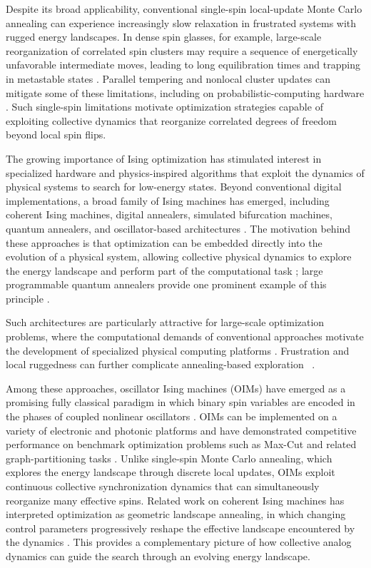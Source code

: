 \documentclass[
reprint,
amsmath,amssymb,
aps,
pre,
floatfix,
]{revtex4-2}
\begin{document}
Despite its broad applicability, conventional single-spin local-update Monte Carlo annealing can experience increasingly slow relaxation in frustrated systems with rugged energy landscapes. In dense spin glasses, for example, large-scale reorganization of correlated spin clusters may require a sequence of energetically unfavorable intermediate moves, leading to long equilibration times and trapping in metastable states \cite{BinderYoung1986,Young1997,MPV1987}. Parallel tempering and nonlocal cluster updates can mitigate some of these limitations, including on probabilistic-computing hardware \cite{Chowdhury2025ProbabilisticComputers}. Such single-spin limitations motivate optimization strategies capable of exploiting collective dynamics that reorganize correlated degrees of freedom beyond local spin flips.

The growing importance of Ising optimization has stimulated interest in specialized hardware and physics-inspired algorithms that exploit the dynamics of physical systems to search for low-energy states. Beyond conventional digital implementations, a broad family of Ising machines has emerged, including coherent Ising machines, digital annealers, simulated bifurcation machines, quantum annealers, and oscillator-based architectures \cite{machines,Delacour2026ProbabilisticReview,machines1,machines2,Goto2021}. The motivation behind these approaches is that optimization can be embedded
directly into the evolution of a physical system, allowing collective physical
dynamics to explore the energy landscape and perform part of the computational
task \cite{OIM}; large programmable quantum annealers provide one prominent
example of this principle \cite{King2023QuantumCritical}.

Such architectures are particularly attractive for large-scale optimization
problems, where the computational demands of conventional approaches motivate
the development of specialized physical computing platforms
\cite{machines,Neumann}. Frustration and local ruggedness can further complicate annealing-based exploration ~\cite{King2019Ruggedness}.

Among these approaches, oscillator Ising machines (OIMs) have emerged as a
promising fully classical paradigm in which binary spin variables are encoded
in the phases of coupled nonlinear oscillators \cite{OIM,Neumann}. OIMs can
be implemented on a variety of electronic and photonic platforms and have
demonstrated competitive performance on benchmark optimization problems such
as Max-Cut and related graph-partitioning tasks \cite{Energy3,Energy4}.
Unlike single-spin Monte Carlo annealing, which explores the energy landscape through
discrete local updates, OIMs exploit continuous collective synchronization
dynamics that can simultaneously reorganize many effective spins. Related
work on coherent Ising machines has interpreted optimization as geometric
landscape annealing, in which changing control parameters progressively
reshape the effective landscape encountered by the dynamics
\cite{Yamamura2024Landscape}. This provides a complementary picture of how
collective analog dynamics can guide the search through an evolving energy
landscape.
\end{document}
